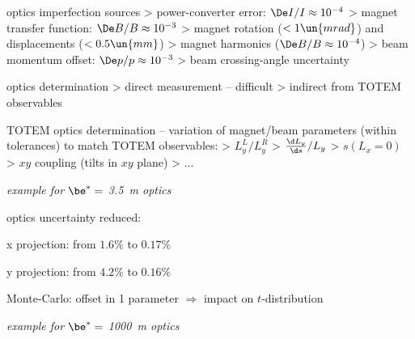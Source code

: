 \newpage %

\vfil
\> optics imperfection sources
\>> power-converter error: $\De I / I \approx 10^{-4}$
\>> magnet transfer function: $\De B / B \approx 10^{-3}$
\>> magnet rotation ($<1\un{mrad}$) and displacements ($<0.5\un{mm}$)
\>> magnet harmonics ($\De B / B \approx 10^{-4}$)
\>> beam momentum offset: $\De p / p \approx 10^{-3}$
\>> beam crossing-angle uncertainty

\vfil
\> optics determination
\>> direct measurement -- difficult
\>> indirect from TOTEM observables

\vfil
\> TOTEM optics determination -- variation of magnet/beam parameters (within tolerances) to match TOTEM observables:
\>> $L_y^L / L_y^R$
\>> ${\d L_y\over \d s} / L_y$
\>> $s(L_x = 0)$
\>> $xy$ coupling (tilts in $xy$ plane)
\>> ...

\vfil

\newpage %

\centerline{\em{example for $\be^* = $ 3.5\ m optics}}

\vfil
{}

\vfil

\> optics uncertainty reduced:

\cBlack
\centerline{x projection: from $1.6\%$ to $0.17\%$}
\centerline{y projection: from $4.2\%$ to $0.16\%$}

\vfil

\cBlue
{\SetFontSizesVIII
{}

}

\newpage %

\> Monte-Carlo: offset in 1 parameter $\Rightarrow$ impact on $t$-distribution

\vskip1mm

\centerline{\em{example for $\be^* = $ 1000\ m optics}}

\centerline{}


